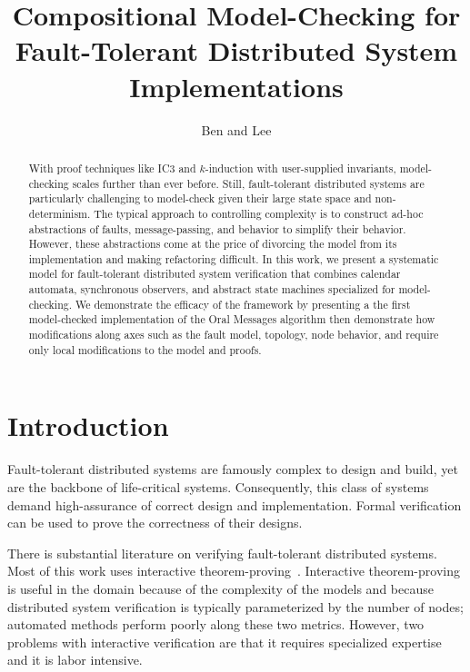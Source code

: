 \documentclass{llncs/llncs}
\newcommand{\lee}[1]{ } %
\newcommand{\lee}[1]{ {\color{blue}$<$lee: #1$>$} } %
\begin{document}
\title{Compositional Model-Checking for Fault-Tolerant Distributed System Implementations}
\author{Ben and Lee}


\maketitle


\begin{abstract}
With proof techniques like IC3 and $k$-induction with user-supplied invariants, model-checking scales further than ever before. Still, fault-tolerant distributed systems are particularly challenging to model-check given their large state space and non-determinism. The typical approach to controlling complexity is to construct ad-hoc abstractions of faults, message-passing, and behavior to simplify their behavior. However, these abstractions come at the price of divorcing the model from its implementation and making refactoring difficult. In this work, we present a systematic model for fault-tolerant distributed system verification that combines calendar automata, synchronous observers, and abstract state machines specialized for model-checking. We demonstrate the efficacy of the framework by presenting a the first model-checked implementation of the Oral Messages algorithm then demonstrate how modifications along axes such as the fault model, topology, node behavior, and require only local modifications to the model and proofs.
\end{abstract}

\section{Introduction}

\lee{needs to be redone.}
Fault-tolerant distributed systems are famously complex to design and build, yet are the  backbone of life-critical systems. Consequently, this class of systems demand high-assurance of correct design and implementation. Formal verification can be used to prove the correctness of their designs.

There is substantial literature on verifying fault-tolerant distributed systems. Most of this work uses interactive theorem-proving~\cite{}. Interactive theorem-proving is useful in the domain because of the complexity of the models and because distributed system verification is typically parameterized by the number of nodes; automated methods perform poorly along these two metrics. However, two problems with interactive verification are that it requires specialized expertise and it is labor intensive.
\end{document}
